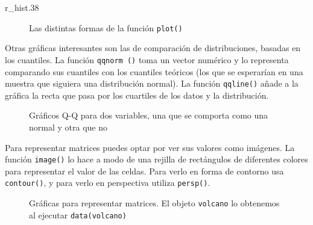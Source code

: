 \begin{figura}{r_hist}{.38}
\caption{Histograma obtenido con {\tt hist (TV)}}
\end{figura}

\begin{figure}[p]
\centering
{}
\caption{Las distintas formas de la función {\tt plot()}}
\end{figure}


Otras gráficas interesantes son  las de comparación de distribuciones,
basadas en  los cuantiles. La función  {\tt qqnorm ()} toma  un vector
numérico y  lo representa comparando  sus cuantiles con  los cuantiles
teóricos  (los que  se  esperarían  en una  muestra  que siguiera  una
distribución normal). La función {\tt  qqline()} añade a la gráfica la
recta que pasa por los cuartiles de los datos y la distribución.

\begin{figure}[hbtp]
\centering
{}
\caption[Gráficos Q-Q para dos variables]%
{Gráficos Q-Q para dos variables, una que se comporta como una
normal y otra que no}
\end{figure}


Para  representar  matrices puedes  optar  por  ver sus  valores  como
imágenes. La  función {\tt image()} lo  hace a modo de  una rejilla de
rectángulos de  diferentes colores  para representar  el valor  de las
celdas. Para  verlo en forma de  contorno usa {\tt contour()},  y para
verlo en perspectiva utiliza {\tt persp()}.

\begin{figure}[htbp]
\centering
{}
\caption[Gráficas para  representar matrices]%
{Gráficas para  representar matrices. El objeto  {\tt volcano}
lo obtenemos al ejecutar {\tt data(volcano)}}
\end{figure}

